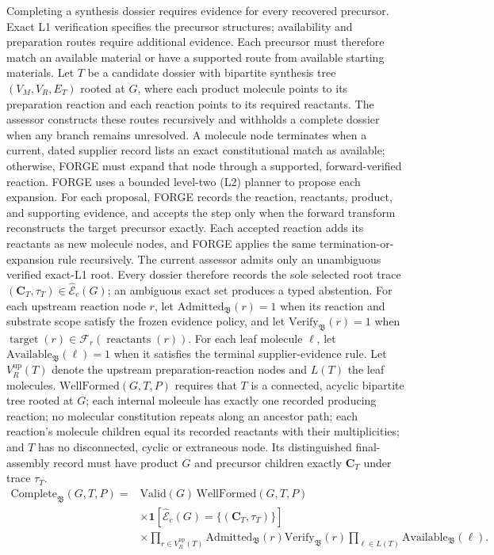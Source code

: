\documentclass{article}
\theoremstyle{definition}
\begin{document}
Completing a synthesis dossier requires evidence for every recovered precursor. Exact L1
verification specifies the precursor structures; availability and preparation routes require
additional evidence. Each precursor must therefore match an available material or have a supported
route from available starting materials.
Let $T$ be a candidate dossier with bipartite synthesis tree $(V_M,V_R,E_T)$ rooted at $G$, where each product molecule
points to its preparation reaction and each reaction points to its required reactants.
The assessor constructs these routes recursively and withholds a complete dossier when any branch
remains unresolved.
A molecule node terminates when a current, dated supplier record lists an exact constitutional match
as available; otherwise, FORGE must expand that node through a supported, forward-verified reaction.
FORGE uses a bounded level-two (L2) planner to propose each expansion.
For each proposal, FORGE records the reaction, reactants, product, and supporting evidence, and
accepts the step only when the forward transform reconstructs the target precursor exactly.
Each accepted reaction adds its reactants as new molecule nodes, and FORGE applies the same
termination-or-expansion rule recursively.
The current assessor admits only an unambiguous verified exact-L1 root. Every dossier therefore
records the sole selected root trace
$(\mathbf C_T,\tau_T)\in\widehat{\mathcal E}_c(G)$; an ambiguous exact set produces a typed
abstention. For each upstream reaction node $r$, let
$\mathrm{Admitted}_{\mathfrak B}(r)=1$ when its reaction and substrate scope satisfy the frozen
evidence policy, and let $\mathrm{Verify}_{\mathfrak B}(r)=1$ when
$\operatorname{target}(r)\in\mathcal F_r(\operatorname{reactants}(r))$.
For each leaf molecule $\ell$, let $\mathrm{Available}_{\mathfrak B}(\ell)=1$ when it satisfies the terminal
supplier-evidence rule.
Let $V_R^{\mathrm{up}}(T)$ denote the upstream preparation-reaction nodes and $L(T)$ the leaf
molecules. $\mathrm{WellFormed}(G,T,P)$ requires that $T$ is a connected, acyclic bipartite tree
rooted at $G$; each internal molecule has exactly one recorded producing reaction; no molecular constitution repeats along an ancestor path; each reaction's
molecule children equal its recorded reactants with their multiplicities; and $T$ has no disconnected, cyclic or
extraneous node. Its distinguished final-assembly record must have product $G$ and precursor
children exactly $\mathbf C_T$ under trace $\tau_T$.
\begin{equation}
\begin{aligned}
    \mathrm{Complete}_{\mathfrak B}(G,T,P)
    ={}&\mathrm{Valid}(G)\,\mathrm{WellFormed}(G,T,P)\\
    &\times\mathbf1\!\left[\widehat{\mathcal E}_c(G)=\{(\mathbf C_T,\tau_T)\}\right]\\
    &\times\prod_{r\in V_R^{\mathrm{up}}(T)}
    \mathrm{Admitted}_{\mathfrak B}(r)\mathrm{Verify}_{\mathfrak B}(r)
    \prod_{\ell\in L(T)}\mathrm{Available}_{\mathfrak B}(\ell).
\end{aligned}
\end{equation}
\end{document}
